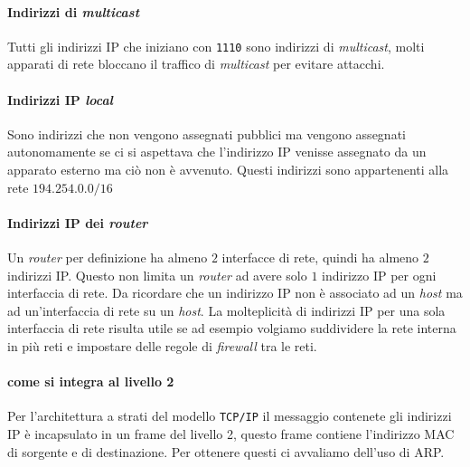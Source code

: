             \paragraph{Indirizzi di \textit{multicast}} Tutti gli indirizzi \Acrshort*{IP} che iniziano con \texttt{1110} sono indirizzi di \textit{multicast}, molti apparati di rete bloccano il traffico di \textit{multicast} per evitare attacchi.
            \paragraph{Indirizzi \Acrshort*{IP} \textit{local}} Sono indirizzi che non vengono assegnati pubblici ma vengono assegnati autonomamente se ci si aspettava che l'indirizzo \Acrshort*{IP} venisse assegnato da un apparato esterno ma ciò non è avvenuto. Questi indirizzi sono appartenenti alla rete $194.254.0.0/16$ 
            \paragraph{Indirizzi \Acrshort*{IP} dei \textit{router}} Un \textit{router} per definizione ha almeno $2$ interfacce di rete, quindi ha almeno $2$ indirizzi \Acrshort*{IP}. Questo non limita un \textit{router} ad avere solo $1$ indirizzo \Acrshort*{IP} per ogni interfaccia di rete. Da ricordare che un indirizzo \Acrshort*{IP} non è associato ad un \textit{host} ma ad un'interfaccia di rete su un \textit{host}. La molteplicità di indirizzi \Acrshort*{IP} per una sola interfaccia di rete risulta utile se ad esempio volgiamo suddividere la rete interna in più reti e impostare delle regole di \textit{firewall} tra le reti.
            \paragraph{come si integra al livello 2} Per l'architettura a strati del modello \texttt{TCP/IP} il messaggio contenete gli indirizzi \Acrshort*{IP} è incapsulato in un frame del livello 2, questo frame contiene l'indirizzo \Acrshort*{MAC} di sorgente e di destinazione. Per ottenere questi ci avvaliamo dell'uso di \Acrshort*{ARP}.

